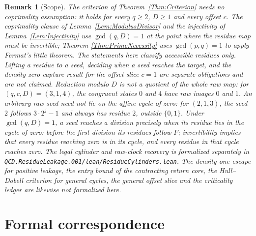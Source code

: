 \documentclass[11pt,letterpaper]{article}
\newtheorem{remark}[theorem]{Remark}
\begin{document}
\begin{remark}[Scope]\label{Rem:Scope}
The criterion of Theorem~\ref{Thm:Criterion} needs no coprimality
assumption: it holds for every \(q\ge2\), \(D\ge1\) and every offset \(c\).
The coprimality clause of Lemma~\ref{Lem:ModulusDivisor} and the injectivity
of Lemma~\ref{Lem:Injectivity} use \(\gcd(q,D)=1\) at the
point where the residue map must be invertible; Theorem
\ref{Thm:PrimeNecessity} uses \(\gcd(p,q)=1\) to apply Fermat's little
theorem. The statements here classify accessible residues only. Lifting a
residue to a seed, deciding when a seed reaches the target, and the
density-zero capture result for the offset slice \(c=1\) are separate
obligations and are not claimed. Reduction modulo \(D\) is not a quotient of the whole raw map:
for \((q,c,D)=(3,1,4)\), the congruent states \(0\) and \(4\) have raw images
\(0\) and \(1\). An arbitrary raw seed need not lie on the affine cycle
of zero: for \((2,1,3)\), the seed \(2\) follows \(3\cdot2^j-1\) and
always has residue \(2\), outside \(\{0,1\}\).
Under \(\gcd(q,D)=1\), a seed reaches a division precisely when its residue
lies in the cycle of zero: before the first division its residues follow
\(F\); invertibility implies that every residue reaching zero is in its
cycle, and every residue in that cycle reaches zero. The legal cylinder
and raw-clock recovery is formalized separately in
\texttt{QCD.ResidueLeakage.001/lean/ResidueCylinders.lean}.
The density-one escape for positive leakage, the entry bound of the contracting return core, the
Hull--Dobell criterion for general cycles, the general offset slice and the
criticality ledger are likewise not formalized here.
\end{remark}

\section{Formal correspondence}
\end{document}
